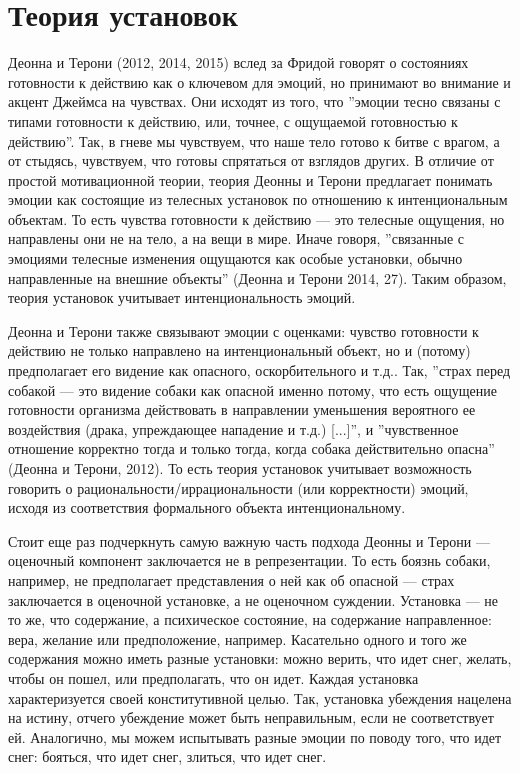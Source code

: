 \documentclass[11pt]{book}
\begin{document}
\section{Теория установок}

Деонна и Терони (2012, 2014, 2015) вслед за Фридой говорят о состояниях готовности к действию как о ключевом для эмоций, но принимают во внимание и акцент Джеймса на чувствах. Они исходят из того, что ''эмоции тесно связаны с типами готовности к действию, или, точнее, с ощущаемой готовностью к действию''. Так, в гневе мы чувствуем, что наше тело готово к битве с врагом, а от стыдясь, чувствуем, что готовы спрятаться от взглядов других. В отличие от простой мотивационной теории, теория Деонны и Терони предлагает понимать эмоции как состоящие из телесных установок по отношению к интенциональным объектам. То есть чувства готовности к действию --- это телесные ощущения, но направлены они не на тело, а на вещи в мире. Иначе говоря, ''связанные с эмоциями телесные изменения ощущаются как особые установки, обычно направленные на внешние объекты'' (Деонна и Терони 2014, 27). Таким образом, теория установок учитывает интенциональность эмоций.

Деонна и Терони также связывают эмоции с оценками: чувство готовности к действию не только направлено на интенциональный объект, но и (потому) предполагает его видение как опасного, оскорбительного и т.д.. Так, ''страх перед собакой --- это видение собаки как опасной именно потому, что есть ощущение готовности организма действовать в направлении уменьшения вероятного ее воздействия (драка, упреждающее нападение и т.д.) [...]'', и ''чувственное отношение корректно тогда и только тогда, когда собака действительно опасна'' (Деонна и Терони, 2012). То есть теория установок учитывает возможность говорить о рациональности/иррациональности (или корректности) эмоций, исходя из соответствия формального объекта интенциональному.

Стоит еще раз подчеркнуть самую важную часть подхода Деонны и Терони --- оценочный компонент заключается не в репрезентации. То есть боязнь собаки, например, не предполагает представления о ней как об опасной --- страх заключается в оценочной установке, а не оценочном суждении. Установка --- не то же, что содержание, а психическое состояние, на содержание направленное: вера, желание или предположение, например. Касательно одного и того же содержания можно иметь разные установки: можно верить, что идет снег, желать, чтобы он пошел, или предполагать, что он идет. Каждая установка характеризуется своей конститутивной целью. Так, установка убеждения нацелена на истину, отчего убеждение может быть неправильным, если не соответствует ей. Аналогично, мы можем испытывать разные эмоции по поводу того, что идет снег: бояться, что идет снег, злиться, что идет снег.
\end{document}
